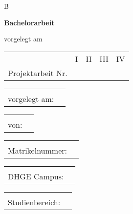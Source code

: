 \vspace{\fill}
\maketitle

\if\CARBEIT B

	\begin{center}
		{\LARGE\bf Bachelorarbeit}
		
		\vspace{0.5cm}vorgelegt am \CDATUM
	\end{center}

	\vspace{1cm}

	\def\BETREUER{Gutachter}

\else

	\begin{tabular}{rcccc}
		\hspace{0.45\textwidth} &       I       &     II      &     III     &     IV      \\
	{Projektarbeit Nr.}  \markBox{\CARBEIT}{&}
	\end{tabular}

	\begin{tabular}{rl}
		\hspace{0.45\textwidth} &       \\
		vorgelegt am: & \CDATUM
	\end{tabular}

	\def\BETREUER{Betreuer}

\fi

\begin{tabular}{rl}
	\hspace{0.45\textwidth} &              \\
			von: & \CAUTHOR
\end{tabular}

\begin{tabular}{rl}
	\hspace{0.45\textwidth} &         \\
	Matrikelnummer: & \CMATRIKEL
\end{tabular}

\begin{tabular}{rl}
	\hspace{0.45\textwidth} &      \\
	DHGE Campus: & \CCAMPUS
\end{tabular}

\begin{tabular}{rl}
	\hspace{0.45\textwidth} &         \\
	Studienbereich: & \CBEREICH
\end{tabular}

